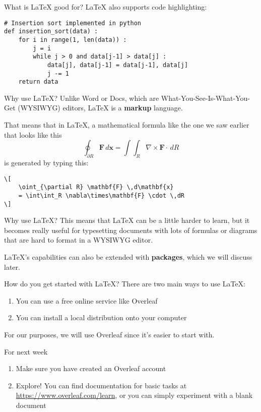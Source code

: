 \documentclass{beamer}
\begin{document}
\begin{frame}[fragile]{What is \LaTeX{} good for?}
    \LaTeX{} also supports code highlighting:
    \begin{verbatim}
# Insertion sort implemented in python
def insertion_sort(data) :
	for i in range(1, len(data)) :
		j = i
		while j > 0 and data[j-1] > data[j] :
			data[j], data[j-1] = data[j-1], data[j]
			j -= 1
	return data
    \end{verbatim}
\end{frame}

\begin{frame}[fragile]{Why use \LaTeX?}
    \pause
    Unlike Word or Docs, which are What-You-See-Is-What-You-Get (WYSIWYG) editors,
    \LaTeX{} is a \textbf{markup} language.
    
    \pause
    That means that in \LaTeX, a mathematical formula like the one we saw earlier that looks like this
    \[
        \oint_{\partial R} \mathbf{F} \,d\mathbf{x}
        = \int \int_R \nabla \times \mathbf{F} \cdot \,dR
    \]
    is generated by typing this:
    \pause
    \begin{verbatim}
\[
    \oint_{\partial R} \mathbf{F} \,d\mathbf{x}
    = \int\int_R \nabla\times\mathbf{F} \cdot \,dR
\]
    \end{verbatim}
\end{frame}

\begin{frame}{Why use \LaTeX?}
    This means that \LaTeX{} can be a little harder to learn, but it becomes really useful for
    typesetting documents with lots of formulas or diagrams that are hard to format in a WYSIWYG
    editor.
    
    \pause
    \LaTeX's capabilities can also be extended with \textbf{packages}, which we will discuss later.
\end{frame}

\begin{frame}{How do you get started with \LaTeX?}
    \pause
    There are two main ways to use \LaTeX:
    \begin{enumerate}
        \pause \item You can use a free online service like Overleaf
        \pause \item You can install a local distribution onto your computer
    \end{enumerate}
    \pause
    For our purposes, we will use Overleaf since it's easier to start with.
\end{frame}

\begin{frame}{For next week}
    \begin{enumerate}
        \item Make sure you have created an Overleaf account
        \item Explore! You can find documentation for basic tasks at
            \url{https://www.overleaf.com/learn}, or you can simply experiment with a blank document
    \end{enumerate}
\end{frame}
\end{document}

